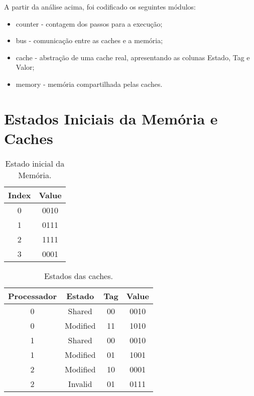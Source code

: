 \documentclass[12pt]{article}
\begin{document}
\vspace{\baselineskip}

\par A partir da análise acima, foi codificado os seguintes módulos:

\begin{itemize}
	\item counter - contagem dos passos para a execução;
	\item bus - comunicação entre as caches e a memória;
	\item cache - abstração de uma cache real, apresentando as colunas Estado, Tag e Valor;
	\item memory - memória compartilhada pelas caches.
\end{itemize}

\section{Estados Iniciais da Memória e Caches}

\begin{table}[h!]
    \centering
    \begin{tabular}{|c|c|}
        \hline
        \textbf{Index} & \textbf{Value}\\ \hline
        0  & 0010   \\ \hline
        1  & 0111   \\ \hline
        2  & 1111   \\ \hline
        3  & 0001   \\ \hline
    \end{tabular}
    \caption{Estado inicial da Memória.}
    \label{tab: memoria}
\end{table}

\begin{table}[h!]
    \centering
    \begin{tabular}{|c|c|c|c|}
        \hline 
        \textbf{Processador} & \textbf{Estado} & \textbf{Tag} & \textbf{Value} \\ \hline
        0  & Shared   & 00 & 0010   \\ \hline
        0  & Modified & 11 & 1010   \\ \hline
        1  & Shared   & 00 & 0010   \\ \hline
        1  & Modified & 01 & 1001   \\ \hline
        2  & Modified & 10 & 0001   \\ \hline
        2  & Invalid  & 01 & 0111   \\ \hline
    \end{tabular}
    \caption{Estados das caches.}
    \label{tab: caches}
\end{table}
\end{document}
